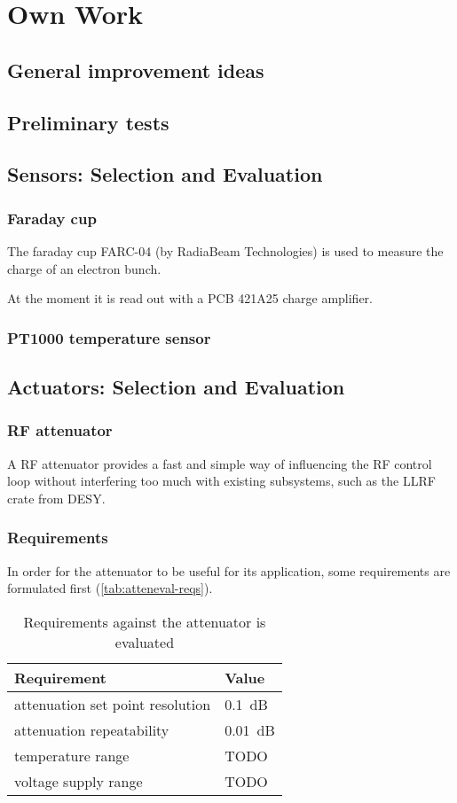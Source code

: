 \chapter{Own Work}
\section{General improvement ideas}
\section{Preliminary tests}
\section{Sensors: Selection and Evaluation}
\subsection{Faraday cup}
The faraday cup FARC-04\cite{radiabeamFaradayCups} (by RadiaBeam Technologies) is used to measure the charge of an electron bunch.

At the moment it is read out with a PCB 421A25\cite{pcbsynotechPCB421A25Charge} charge amplifier.

\subsection{PT1000 temperature sensor}
\section{Actuators: Selection and Evaluation}
\subsection{RF attenuator}
A RF attenuator provides a fast and simple way of influencing the RF control loop without interfering too much with existing subsystems, such as the LLRF crate from DESY.

\FloatBarrier
\subsection{Requirements}
In order for the attenuator to be useful for its application, some requirements are formulated first (\autoref{tab:atteneval-reqs}).

\begin{table}[tbh!]
	\centering
	\caption{Requirements against the attenuator is evaluated}
	\label{tab:atteneval-reqs}
	\begin{tabular}{ll}
		\toprule
		\textbf{Requirement} & \textbf{Value}\\
		\midrule
		attenuation set point resolution & \SI{0.1}{\dB}\\
		attenuation repeatability  & \SI{0.01}{\dB}\\
		\midrule
		temperature range & TODO \\
		voltage supply range & TODO\\
		\bottomrule
	\end{tabular}
\end{table}

